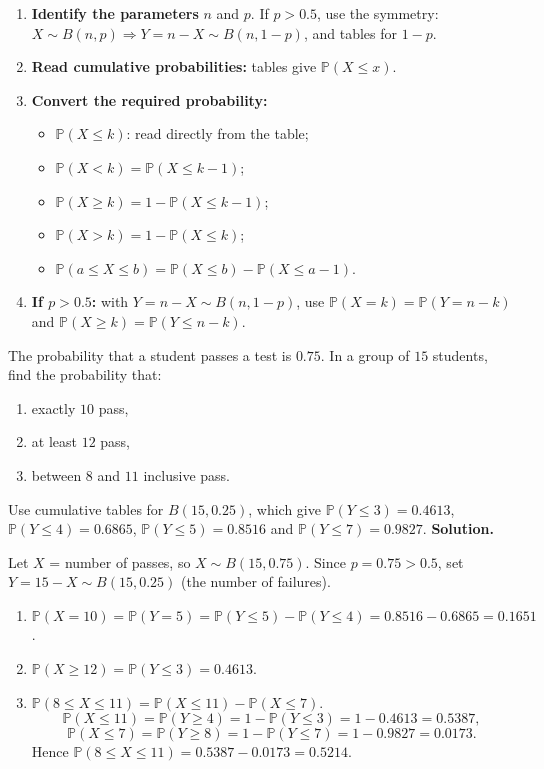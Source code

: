 \documentclass[11pt]{article}
\begin{document}
\begin{methode}
\begin{enumerate}
\item \textbf{Identify the parameters} $n$ and $p$. If $p > 0.5$, use the symmetry: $X \sim B(n,p) \Rightarrow Y = n-X \sim B(n,1-p)$, and tables for $1-p$.
\item \textbf{Read cumulative probabilities:} tables give $\mathbb{P}(X \le x)$.
\item \textbf{Convert the required probability:}
\begin{itemize}
\item $\mathbb{P}(X \le k)$: read directly from the table;
\item $\mathbb{P}(X < k) = \mathbb{P}(X \le k-1)$;
\item $\mathbb{P}(X \ge k) = 1 - \mathbb{P}(X \le k-1)$;
\item $\mathbb{P}(X > k) = 1 - \mathbb{P}(X \le k)$;
\item $\mathbb{P}(a \le X \le b) = \mathbb{P}(X \le b) - \mathbb{P}(X \le a-1)$.
\end{itemize}
\item \textbf{If $p > 0.5$:} with $Y = n - X \sim B(n, 1-p)$, use $\mathbb{P}(X = k) = \mathbb{P}(Y = n-k)$ and $\mathbb{P}(X \ge k) = \mathbb{P}(Y \le n-k)$.
\end{enumerate}
\end{methode}

\begin{exoresolu}
The probability that a student passes a test is $0.75$. In a group of $15$ students, find the probability that:
\begin{enumerate}
\item exactly $10$ pass,
\item at least $12$ pass,
\item between $8$ and $11$ inclusive pass.
\end{enumerate}
Use cumulative tables for $B(15, 0.25)$, which give $\mathbb{P}(Y \le 3) = 0.4613$, $\mathbb{P}(Y \le 4) = 0.6865$, $\mathbb{P}(Y \le 5) = 0.8516$ and $\mathbb{P}(Y \le 7) = 0.9827$.
\tcblower
\textbf{Solution.}

Let $X$ = number of passes, so $X \sim B(15, 0.75)$. Since $p = 0.75 > 0.5$, set $Y = 15 - X \sim B(15, 0.25)$ (the number of failures).
\begin{enumerate}
\item $\mathbb{P}(X = 10) = \mathbb{P}(Y = 5) = \mathbb{P}(Y \le 5) - \mathbb{P}(Y \le 4) = 0.8516 - 0.6865 = 0.1651$.
\item $\mathbb{P}(X \ge 12) = \mathbb{P}(Y \le 3) = 0.4613$.
\item $\mathbb{P}(8 \le X \le 11) = \mathbb{P}(X \le 11) - \mathbb{P}(X \le 7)$.
\[
\mathbb{P}(X \le 11) = \mathbb{P}(Y \ge 4) = 1 - \mathbb{P}(Y \le 3) = 1 - 0.4613 = 0.5387,
\]
\[
\mathbb{P}(X \le 7) = \mathbb{P}(Y \ge 8) = 1 - \mathbb{P}(Y \le 7) = 1 - 0.9827 = 0.0173.
\]
Hence $\mathbb{P}(8 \le X \le 11) = 0.5387 - 0.0173 = 0.5214$.
\end{enumerate}
\end{exoresolu}
\end{document}

